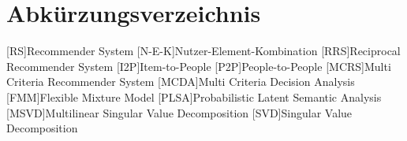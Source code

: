 \renewcommand{\chaptermark}[1]{\markboth{\spacedlowsmallcaps{#1}}{\spacedlowsmallcaps{#1}}}
\renewcommand{\sectionmark}[1]{\markright{\thesection\enspace\spacedlowsmallcaps{#1}}}
\chapter*{Abk\"{u}rzungsverzeichnis}

\begin{acronym}[AWGN]%
  [RS]{Recommender System}
  [N-E-K]{Nutzer-Element-Kombination}
  [RRS]{Reciprocal Recommender System}
  [I2P]{Item-to-People}
  [P2P]{People-to-People}
  [MCRS]{Multi Criteria Recommender System}
  [MCDA]{Multi Criteria Decision Analysis}
  [FMM]{Flexible Mixture Model}
  [PLSA]{Probabilistic Latent Semantic Analysis}
  [MSVD]{Multilinear Singular Value Decomposition}
  [SVD]{Singular Value Decomposition}
\end{acronym}

\cleardoublepage
